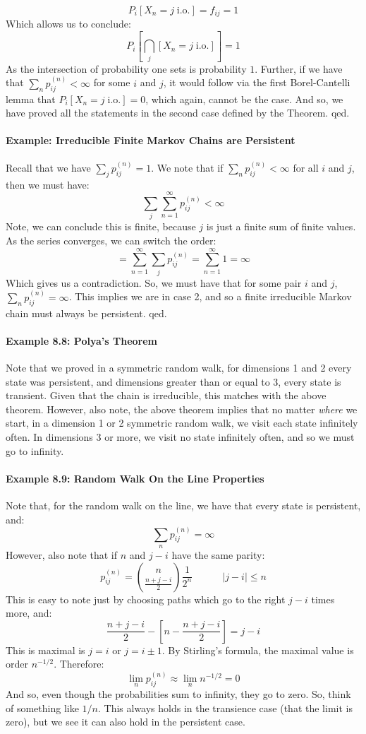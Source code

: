 \documentclass[12pt,a4paper]{article}
\newcommand{\1}[1]{\mathbbm{1}\left\{ #1 \right\}}
\newcommand{\io}{\text{i.o.}}
\begin{document}
$$
	P_i\left[X_n = j \; \io\right] = f_{ij} = 1
$$
Which allows us to conclude:
$$
	P_i\left[\bigcap_j [X_n = j \; \io]\right] = 1
$$
As the intersection of probability one sets is probability $1$. Further, if we have that $\sum_n p_{ij}^{(n)} < \infty$ for some $i$ and $j$, it would follow via the first Borel-Cantelli lemma that $P_i\left[X_n = j \; \io\right] = 0$, which again, cannot be the case. And so, we have proved all the statements in the second case defined by the Theorem. qed.


\paragraph{Example: Irreducible Finite Markov Chains are Persistent} Recall that we have $\sum_j p_{ij}^{(n)} = 1$. We note that if $\sum_n p_{ij}^{(n)} < \infty$ for all $i$ and $j$, then we must have:
$$
	\sum_j \sum_{n=1}^\infty p_{ij}^{(n)} < \infty
$$
Note, we can conclude this is finite, because $j$ is just a finite sum of finite values. As the series converges, we can switch the order:
$$
	= \sum_{n=1}^\infty \sum_j p_{ij}^{(n)} = \sum_{n=1}^\infty 1 = \infty
$$
Which gives us a contradiction. So, we must have that for some pair $i$ and $j$, $\sum_n p_{ij}^{(n)} = \infty$. This implies we are in case 2, and so a finite irreducible Markov chain must always be persistent. qed.

\paragraph{Example 8.8: Polya's Theorem} Note that we proved in a symmetric random walk, for dimensions 1 and 2 every state was persistent, and dimensions greater than or equal to 3, every state is transient. Given that the chain is irreducible, this matches with the above theorem. However, also note, the above theorem implies that no matter \textit{where} we start, in a dimension 1 or 2 symmetric random walk, we visit each state infinitely often. In dimensions 3 or more, we visit no state infinitely often, and so we must go to infinity.

\paragraph{Example 8.9: Random Walk On the Line Properties} Note that, for the random walk on the line, we have that every state is persistent, and:
$$
	\sum_n p_{ij}^{(n)} = \infty
$$
However, also note that if $n$ and $j - i$ have the same parity:
$$
	p_{ij}^{(n)} = {n \choose \frac{n + j - i}{2}} \frac{1}{2^n} \quad\quad\quad |j - i| \leq n
$$
This is easy to note just by choosing paths which go to the right $j - i$ times more, and:
$$
	\frac{n + j - i}{2} - \left[n - \frac{n + j - i}{2}\right] = j - i
$$
This is maximal is $j = i$ or $j = i \pm 1$. By Stirling's formula, the maximal value is order $n^{-1/2}$. Therefore:
$$
	\lim_n p_{ij}^{(n)} \approx \lim_n n^{-1/2} = 0
$$
And so, even though the probabilities sum to infinity, they go to zero. So, think of something like $1/n$. This always holds in the transience case (that the limit is zero), but we see it can also hold in the persistent case.
\end{document}
